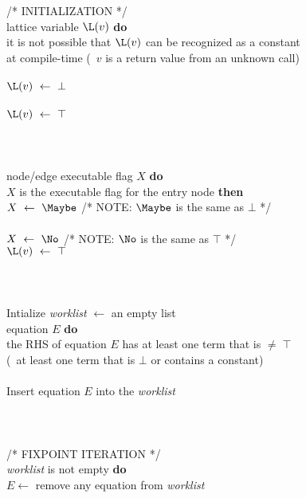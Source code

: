 \begin{figure}%
\begin{center}
\begin{programa}
/* INITIALIZATION */ \\
 lattice variable $\L(v)$ {\bf do}\\
 it is not possible that $\L(v)$ can be recognized as a constant\\
\Td at compile-time (\eg\ $v$ is a return value from an unknown call)\\
\\
\Tc $\L(v)\  \leftarrow\ \bot $\\
\\
\Tc $\L(v)\  \leftarrow\ \top $\\
\\
\\
\\
 node/edge executable flag $X$ {\bf do}\\
 $X$ is the executable flag for the entry node {\bf then}\\
\Tc $X\ \leftarrow\ \Maybe$ /* NOTE: $\Maybe$ is the same as $\bot$ */\\
\\
\Tc $X\ \leftarrow\ \No$ /* NOTE: $\No$ is the same as $\top$ */\\
\Tc $\L(v)\  \leftarrow\ \top $\\
\\
\\
\\
\Ta Intialize {\it worklist} $\leftarrow$ an empty list\\
 equation $E$ {\bf do}\\
 the RHS of equation $E$ has at least one term that is $\not= \; \top$\\
\Td  (\ie\ at least one term that is $\bot$ or contains a constant)\\
\\
\Tc  Insert equation $E$ into the {\it worklist}\\
\\
\\
 \\
/* FIXPOINT ITERATION */ \\
 {\it worklist} is not empty {\bf do}\\
\Tb $E \leftarrow$ remove any equation from {\it worklist}\\

\end{programa}
\end{center}
\end{figure}
